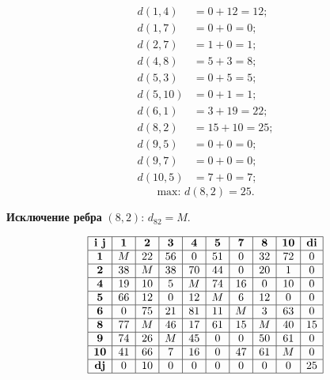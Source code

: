 \documentclass[17pt]{extarticle}
\begin{document}
\[
    \begin{aligned}
        d(1,4)  & = 0 + 12 = 12;  \\
        d(1,7)  & = 0 + 0 = 0;    \\
        d(2,7)  & = 1 + 0 = 1;    \\
        d(4,8)  & = 5 + 3 = 8;    \\
        d(5,3)  & = 0 + 5 = 5;    \\
        d(5,10) & = 0 + 1 = 1;    \\
        d(6,1)  & = 3 + 19 = 22;  \\
        d(8,2)  & = 15 + 10 = 25; \\
        d(9,5)  & = 0 + 0 = 0;    \\
        d(9,7)  & = 0 + 0 = 0;    \\
        d(10,5) & = 7 + 0 = 7;
    \end{aligned}
\]
\[ \text{max: } d(8,2) = 25. \]

\textbf{Исключение ребра} \((8,2)\): \( d_{82} = M \).

\[
    \begin{array}{|c|c|c|c|c|c|c|c|c|c|}
        \hline
        \textbf{i j} & \textbf{1} & \textbf{2} & \textbf{3} & \textbf{4} & \textbf{5} & \textbf{7} & \textbf{8} & \textbf{10} & \textbf{di} \\
        \hline
        \textbf{1}   & M          & 22         & 56         & 0          & 51         & 0          & 32         & 72          & 0           \\
        \hline
        \textbf{2}   & 38         & M          & 38         & 70         & 44         & 0          & 20         & 1           & 0           \\
        \hline
        \textbf{4}   & 19         & 10         & 5          & M          & 74         & 16         & 0          & 10          & 0           \\
        \hline
        \textbf{5}   & 66         & 12         & 0          & 12         & M          & 6          & 12         & 0           & 0           \\
        \hline
        \textbf{6}   & 0          & 75         & 21         & 81         & 11         & M          & 3          & 63          & 0           \\
        \hline
        \textbf{8}   & 77         & M          & 46         & 17         & 61         & 15         & M          & 40          & 15          \\
        \hline
        \textbf{9}   & 74         & 26         & M          & 45         & 0          & 0          & 50         & 61          & 0           \\
        \hline
        \textbf{10}  & 41         & 66         & 7          & 16         & 0          & 47         & 61         & M           & 0           \\
        \hline
        \textbf{dj}  & 0          & 10         & 0          & 0          & 0          & 0          & 0          & 0           & 25          \\
        \hline
    \end{array}
\]
\end{document}
